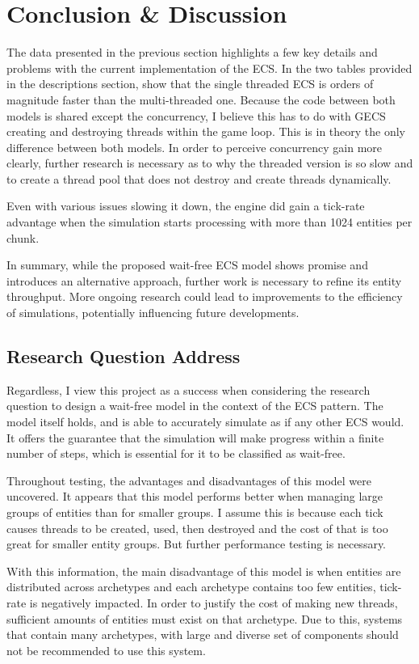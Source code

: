\section{Conclusion \& Discussion}
The data presented in the previous section highlights a few key details and problems with the current implementation of the ECS. In the two tables provided in the descriptions section, show that the single threaded ECS is orders of magnitude faster than the multi-threaded one. Because the code between both models is shared except the concurrency, I believe this has to do with GECS creating and destroying threads within the game loop. This is in theory the only difference between both models. In order to perceive concurrency gain more clearly, further research is necessary as to why the threaded version is so slow and to create a thread pool that does not destroy and create threads dynamically. 

Even with various issues slowing it down, the engine did gain a tick-rate advantage when the simulation starts processing with more than 1024 entities per chunk. 

In summary, while the proposed wait-free ECS model shows promise and introduces an alternative approach, further work is necessary to refine its entity throughput. More ongoing research could lead to improvements to the efficiency of simulations, potentially influencing future developments.

\subsection{Research Question Address}

Regardless, I view this project as a success when considering the research question to design a wait-free model in the context of the ECS pattern. The model itself holds, and is able to accurately simulate as if any other ECS would. It offers the guarantee that the simulation will make progress within a finite number of steps, which is essential for it to be classified as wait-free.

Throughout testing, the advantages and disadvantages of this model were uncovered. It appears that this model performs better when managing large groups of entities than for smaller groups. I assume this is because each tick causes threads to be created, used, then destroyed and the cost of that is too great for smaller entity groups. But further performance testing is necessary.

With this information, the main disadvantage of this model is when entities are distributed across archetypes and each archetype contains too few entities, tick-rate is negatively impacted. In order to justify the cost of making new threads, sufficient amounts of entities must exist on that archetype. Due to this, systems that contain many archetypes, with large and diverse set of components should not be recommended to use this system.

